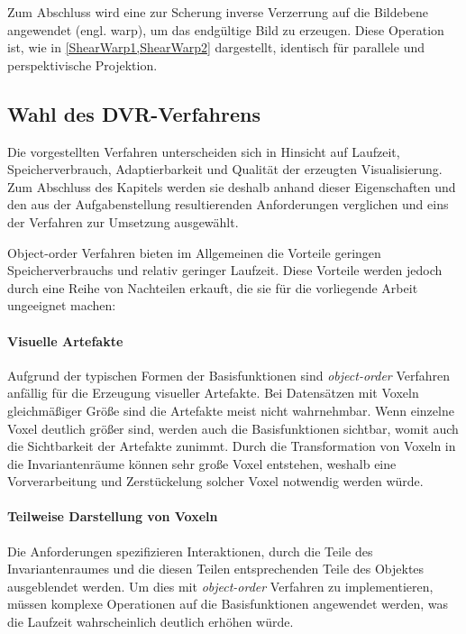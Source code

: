 \documentclass[a4paper,fontsize=12pt,toc=bib,parskip=half,ngerman]{scrartcl}
\begin{document}
Zum Abschluss wird eine zur Scherung inverse Verzerrung auf die Bildebene angewendet (engl. \glq warp\grq{}), um das endg\"ultige Bild zu erzeugen. Diese Operation ist, wie in \cref{ShearWarp1,ShearWarp2} dargestellt, identisch f\"ur parallele und perspektivische Projektion.

\subsection{Wahl des DVR-Verfahrens}
Die vorgestellten Verfahren unterscheiden sich in Hinsicht auf Laufzeit, Speicherverbrauch, Adaptierbarkeit und Qualit\"at der erzeugten Visualisierung. Zum Abschluss des Kapitels werden sie deshalb anhand dieser Eigenschaften und den aus der Aufgabenstellung resultierenden Anforderungen verglichen und eins der Verfahren zur Umsetzung ausgew\"ahlt.

Object-order Verfahren bieten im Allgemeinen die Vorteile geringen Speicherverbrauchs und relativ geringer Laufzeit. Diese Vorteile werden jedoch durch eine Reihe von Nachteilen erkauft, die sie f\"ur die vorliegende Arbeit ungeeignet machen:


\paragraph{Visuelle Artefakte} Aufgrund der typischen Formen der Basisfunktionen sind \textit{object-order} Verfahren anf\"allig f\"ur die Erzeugung visueller Artefakte. Bei Datens\"atzen mit Voxeln gleichm\"a{\ss}iger Gr\"o{\ss}e sind die Artefakte meist nicht wahrnehmbar. Wenn einzelne Voxel deutlich gr\"o{\ss}er sind, werden auch die Basisfunktionen sichtbar, womit auch die Sichtbarkeit der Artefakte zunimmt. Durch die Transformation von Voxeln in die Invariantenr\"aume k\"onnen sehr gro{\ss}e Voxel entstehen, weshalb eine Vorverarbeitung und Zerst\"uckelung solcher Voxel notwendig werden w\"urde.

\paragraph{Teilweise Darstellung von Voxeln} Die Anforderungen spezifizieren Interaktionen, durch die Teile des Invariantenraumes und die diesen Teilen entsprechenden Teile des Objektes ausgeblendet werden. Um dies mit \textit{object-order} Verfahren zu implementieren, m\"ussen komplexe Operationen auf die Basisfunktionen angewendet werden, was die Laufzeit wahrscheinlich deutlich erh\"ohen w\"urde.
\end{document}
